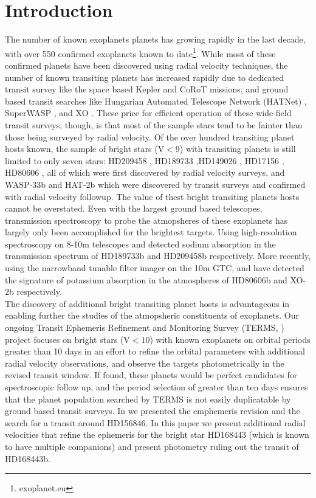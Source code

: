 \documentclass[12pt,preprint]{emulateapj}
\begin{document}
\section{Introduction}
\label{introduction}
\indent The number of known exoplanets planets has growing rapidly in the last decade, with over 550 confirmed exoplanets known to date\footnote{exoplanet.eu}. While most of these confirmed planets have been discovered using radial velocity techniques, the number of known transiting planets has increased rapidly due to dedicated transit survey like the space based   Kepler  \citep{Borucki11} and CoRoT \citet{Barge08} missions, and ground based transit searches like Hungarian Automated Telescope Network (HATNet)\citet{Bakos04} , SuperWASP \cite{Pollacco06}, and XO \citep{McCullough05}. These price for efficient operation of  these wide-field transit surveys, though, is that most of the sample stars tend to be fainter than those being surveyed by radial velocity. Of the over hundred transiting planet hosts known, the sample of bright stars  (V$<$9) with transiting planets is still limited to only seven stars:  HD209458 \citep{Charbonneau00, Henry00}, HD189733 \citep{Bouchy05} ,HD149026 \citep{Sato05}, HD17156 \citep{Barbieri07}, HD80606 \citep{Moutou09, Fossey09}, all of which were first discovered by radial velocity surveys, and WASP-33b and HAT-2b which were discovered by transit surveys and confirmed with radial velocity followup. The value of thest bright transiting planets hosts cannot be overstated. Even with the largest ground based telescopes, transmission spectroscopy to probe the atmopsheres of these exoplanets has largely only been accomplished for the brightest targets. Using high-resolution spectroscopy on 8-10m telescopes \citet{Redfield08}  and \citet{Snellen08} detected sodium absorption in the transmission spectrum of HD189733b and HD209458b respectively.  More recently, using the narrowband tunable filter imager on the 10m GTC, \citet{Colon10} and \citet{Sing11} have detected the signature of potassium absorption in the atmospheres of HD80606b and XO-2b respectively. \\
\indent The discovery of additional bright transiting planet hosts is advantageous in enabling further the studies of the atmopsheric constituents of exoplanets. Our ongoing Transit Ephemeris Refinement and Monitoring Survey (TERMS, \citet{Kane09}) project focuses on bright stars (V$<10$) with known exoplanets on orbital periods greater than 10 days in an effort to refine the orbital parameters with additional radial velocity observations, and observe the targets photometrically in the revised transit window. If found, these planets would be perfect candidates for spectroscopic follow up, and the  period selection of greater than ten days ensures that the planet population searched by TERMS is not easily duplicatable by ground based transit surveys. In \citet{Kane11} we presented the emphemeris revision and  the search for a transit around HD156846. In this paper we present additional radial velocities that refine the ephemeris for the bright star HD168443 (which is known to have multiple companions) and present photometry ruling out the transit of HD168443b. 
\end{document}
